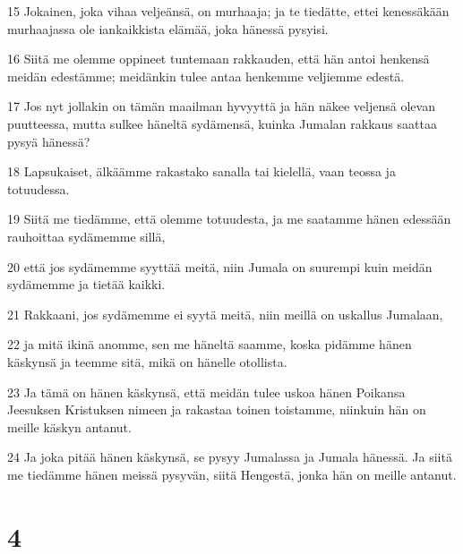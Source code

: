 \par 15 Jokainen, joka vihaa veljeänsä, on murhaaja; ja te tiedätte, ettei kenessäkään murhaajassa ole iankaikkista elämää, joka hänessä pysyisi.
\par 16 Siitä me olemme oppineet tuntemaan rakkauden, että hän antoi henkensä meidän edestämme; meidänkin tulee antaa henkemme veljiemme edestä.
\par 17 Jos nyt jollakin on tämän maailman hyvyyttä ja hän näkee veljensä olevan puutteessa, mutta sulkee häneltä sydämensä, kuinka Jumalan rakkaus saattaa pysyä hänessä?
\par 18 Lapsukaiset, älkäämme rakastako sanalla tai kielellä, vaan teossa ja totuudessa.
\par 19 Siitä me tiedämme, että olemme totuudesta, ja me saatamme hänen edessään rauhoittaa sydämemme sillä,
\par 20 että jos sydämemme syyttää meitä, niin Jumala on suurempi kuin meidän sydämemme ja tietää kaikki.
\par 21 Rakkaani, jos sydämemme ei syytä meitä, niin meillä on uskallus Jumalaan,
\par 22 ja mitä ikinä anomme, sen me häneltä saamme, koska pidämme hänen käskynsä ja teemme sitä, mikä on hänelle otollista.
\par 23 Ja tämä on hänen käskynsä, että meidän tulee uskoa hänen Poikansa Jeesuksen Kristuksen nimeen ja rakastaa toinen toistamme, niinkuin hän on meille käskyn antanut.
\par 24 Ja joka pitää hänen käskynsä, se pysyy Jumalassa ja Jumala hänessä. Ja siitä me tiedämme hänen meissä pysyvän, siitä Hengestä, jonka hän on meille antanut.

\chapter{4}

